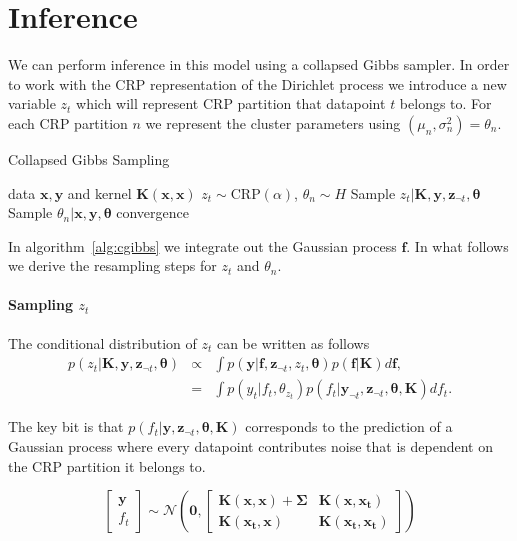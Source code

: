 \documentclass{article}
\begin{document}
\section{Inference}
\label{inference}

We can perform inference in this model using a collapsed Gibbs sampler. In order to work with the CRP representation of the Dirichlet process we introduce a new variable $z_t$ which will represent CRP partition that datapoint $t$ belongs to. For each CRP partition $n$ we represent the cluster parameters using $(\mu_n, \sigma^2_n) = \theta_n$.

\begin{algorithm}[tb]
   \caption{Collapsed Gibbs Sampling}
   \label{alg:cgibbs}
\begin{algorithmic}
    data $\bm{x}, \bm{y}$ and kernel $\bm{K}(\bm{x},\bm{x})$
    $z_t \sim \textrm{CRP}(\alpha)$, $\theta_n \sim H$
   \REPEAT
   \STATE Sample $z_t | \bm{K}, \bm{y}, \bm{z}_{\lnot t}, \bm{\theta}$
   \STATE Sample $\theta_n | \bm{x}, \bm{y}, \bm{\theta}$
   \UNTIL convergence
\end{algorithmic}
\end{algorithm}

In algorithm~\ref{alg:cgibbs} we integrate out the Gaussian process $\bm{f}$. In what follows we derive the resampling steps for $z_t$ and $\theta_n$.

\paragraph{Sampling $z_t$} The conditional distribution of $z_t$ can be written as follows
\begin{eqnarray}
p(z_t | \bm{K}, \bm{y}, \bm{z}_{\lnot t}, \bm{\theta}) & \propto & \int p(\bm{y} | \bm{f}, \bm{z}_{\lnot t}, z_t, \bm{\theta} ) p(\bm{f} | \bm{K}) d \bm{f}, \\
 & = & \int p(y_t | f_t, \theta_{z_t} ) p(f_t | \bm{y}_{\lnot t}, \bm{z}_{\lnot t}, \bm{\theta}, \bm{K}) df_t.
\end{eqnarray}

The key bit is that $p(f_t | \bm{y}, \bm{z}_{\lnot t}, \bm{\theta}, \bm{K})$ corresponds to the prediction of a Gaussian process where every datapoint contributes noise that is dependent on the CRP partition it belongs to.

\begin{equation}
\begin{bmatrix}
\bm{y} \\ f_t
\end{bmatrix}
\sim \mathcal{N}\left(\bm{0},
\begin{bmatrix}
\bm{K}(\bm{x}, \bm{x}) + \bm{\Sigma} & \bm{K}(\bm{x},\bm{x_t}) \\
\bm{K}(\bm{x_t}, \bm{x}) & \bm{K}(\bm{x_t},\bm{x_t})
\end{bmatrix}
\right)
\end{equation}
\end{document}
